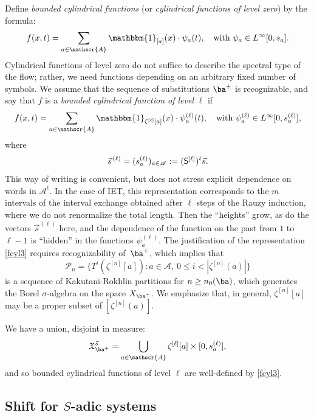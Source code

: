 \documentclass[JEP,XML,SOM,Unicode]{cedram}
\let\mathcal\mathscr
\newcommand{\One}{\mathbbm{1}}
\newcommand{\sep}{:}
\theoremstyle{plain}
\theoremstyle{definition}
\let\sig\sigma
\newcommand\Xx{\mathfrak{X}}
\newcommand\Ak{\mathcal{A}}
\newcommand\Pk{\mathcal{P}}
\newcommand\Sf{{\sf S}}
\newcommand\be{\begin{equation}}
\newcommand\ee{\end{equation}}
\begin{document}
Define \emph{bounded cylindrical functions} (or \emph{cylindrical functions of level zero}) by the formula:
\be \label{fcyl2}
f(x,t)=\sum_{a\in \Ak} \One_{[a]}(x) \cdot \psi_a(t),\quad \text{with } \psi_a\in L^\infty[0,s_a].
\ee
Cylindrical functions of level zero do not suffice to describe the spectral type of the flow; rather, we need functions depending on an arbitrary fixed number of symbols.
We assume that the sequence of substitutions $\ba^+$ is recognizable, and say that $f$ is a \emph{bounded cylindrical function of level} $\ell$ if
\be \label{fcyl3}
f(x,t)=\sum_{a\in \Ak} \One_{\zeta^{[\ell]}[a]}(x) \cdot \psi^{(\ell)}_a(t),\quad \text{with } \psi^{(\ell)}_a\in L^\infty [0,s^{(\ell)}_a],
\ee
where
\[
\vec{s}^{\,(\ell)}= (s^{(\ell)}_a)_{a\in \Ak}:= (\Sf^{[\ell]})^t \vec{s}.
\]
{This way of writing is convenient, but does not stress explicit dependence on words in $\Ak^\ell$. In the case of IET, this representation corresponds to the $m$ intervals of the interval exchange obtained after $\ell$ steps of the Rauzy induction, where we do not renormalize the total length. Then the ``heights'' grow, as do the vectors $\vec s^{(\ell)}$ here, and the dependence of the function on the past from $1$ to $\ell-1$ is ``hidden'' in the functions $\psi^{(\ell)}_a$.}
The justification of the representation \eqref{fcyl3} requires recognizability of~$\ba^+$, which implies that
\be \label{KR}
\Pk_n = \{T^i(\zeta^{[n]}[a])\sep a\in \Ak,\ 0 \le i < |\zeta^{[n]}(a)|\}
\ee
is a sequence of Kakutani-Rokhlin partitions for $n\ge n_0(\ba)$, which generates the Borel $\sig$-algebra on the space $X_{\ba^+}$. We emphasize that, in general, $\zeta^{[n]}[a]$ may be a proper subset of $[\zeta^{[n]}(a)]$.

We have a union, disjoint in measure:
\be \label{ell-decom}
\Xx_{\ba^+}^{\vec{s}} = \bigcup_{a\in \Ak} \zeta^{[\ell]}[a]\times [0, s_a^{(\ell)}],
\ee
and so bounded cylindrical functions of level $\ell$ are well-defined by \eqref{fcyl3}.

\subsection{Shift for $S$-adic systems}
\end{document}
